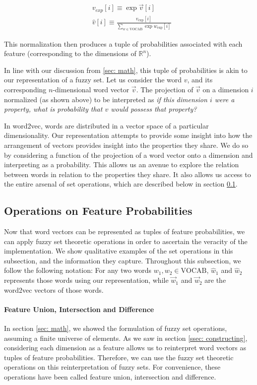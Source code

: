 \documentclass[11pt]{book}
\begin{document}
{\footnotesize \begin{align*} & v_{exp}[i] \equiv \exp \vec v[i] \\ & \hat v[i]
\equiv \frac{v_{\text{exp}}[i]}{\sum_{w \in \text{VOCAB}} \exp
w_{\text{exp}}[i]} \end{align*} }

This normalization then produces a tuple of probabilities associated with each
feature (corresponding to the dimensions of $\mathbb{R}^n$). 

In line with our discussion from \ref{sec: math}, this tuple of probabilities
is akin to our representation of a fuzzy set. Let us consider the word $v$, and
its corresponding $n$-dimensional word vector $\vec v$. The projection of $\vec
v$ on a dimension $i$ normalized (as shown above) to be interpreted as
\textit{if this dimension $i$ were a property, what is probability that $v$
would possess that property?} 

In word2vec, words are distributed in a vector space of a particular
dimensionality. Our representation attempts to provide some insight into how
the arrangement of vectors provides insight into the properties they share. We
do so by considering a function of the projection of a word vector onto a
dimension and interpreting as a probability. This allows us an avenue to
explore the relation between words in relation to the properties they share. It
also allows us access to the entire arsenal of set operations, which are
described below in section \ref{ssec: set operations}.

\subsection{Operations on Feature Probabilities} \label{ssec: set operations}

Now that word vectors can be represented as tuples of feature probabilities, we
can apply fuzzy set theoretic operations in order to ascertain the veracity of
the implementation. We show qualitative examples of the set operations in this
subsection, and the information they capture. Throughout this subsection, we
follow the following notation: For any two words $w_1, w_2 \in \text{VOCAB}$,
$\hat w_1$ and $\hat w_2$ represents those words using our representation,
while $\vec w_1$ and $\vec w_2$ are the word2vec vectors of those words.

\paragraph{Feature Union, Intersection and Difference} In section \ref{sec:
math}, we showed the formulation of fuzzy set operations, assuming a finite
universe of elements. As we saw in section \ref{ssec: constructing},
considering each dimension as a feature allows us to reinterpret word vectors
as tuples of feature probabilities. Therefore, we can use the fuzzy set
theoretic operations on this reinterpretation of fuzzy sets. For convenience,
these operations have been called feature union, intersection and difference. 
\end{document}
